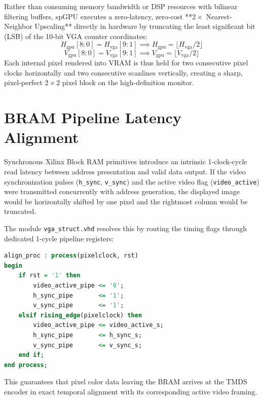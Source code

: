 Rather than consuming memory bandwidth or DSP resources with bilinear filtering buffers, spGPU executes a zero-latency, zero-cost **$2\times$ Nearest-Neighbor Upscaling** directly in hardware by truncating the least significant bit (LSB) of the 10-bit VGA counter coordinates:
\begin{equation}
H_{\text{gpu}}[8:0] = H_{\text{vga}}[9:1] \implies H_{\text{gpu}} = \lfloor H_{\text{vga}} / 2 \rfloor
\end{equation}
\begin{equation}
V_{\text{gpu}}[8:0] = V_{\text{vga}}[9:1] \implies V_{\text{gpu}} = \lfloor V_{\text{vga}} / 2 \rfloor
\end{equation}
Each internal pixel rendered into VRAM is thus held for two consecutive pixel clocks horizontally and two consecutive scanlines vertically, creating a sharp, pixel-perfect $2 \times 2$ pixel block on the high-definition monitor.

\section{BRAM Pipeline Latency Alignment}
Synchronous Xilinx Block RAM primitives introduce an intrinsic 1-clock-cycle read latency between address presentation and valid data output. If the video synchronization pulses (\texttt{h\_sync}, \texttt{v\_sync}) and the active video flag (\texttt{video\_active}) were transmitted concurrently with address generation, the displayed image would be horizontally shifted by one pixel and the rightmost column would be truncated.

The module \texttt{vga\_struct.vhd} resolves this by routing the timing flags through dedicated 1-cycle pipeline registers:
\begin{lstlisting}[language=VHDL, caption={Pipeline Latency Alignment in \texttt{vga\_struct.vhd}.}, label={lst:vga_pipeline}]
align_proc : process(pixelclock, rst)
begin
    if rst = '1' then
        video_active_pipe <= '0';
        h_sync_pipe       <= '1';
        v_sync_pipe       <= '1';
    elsif rising_edge(pixelclock) then
        video_active_pipe <= video_active_s;
        h_sync_pipe       <= h_sync_s;
        v_sync_pipe       <= v_sync_s;
    end if;
end process;
\end{lstlisting}
This guarantees that pixel color data leaving the BRAM arrives at the TMDS encoder in exact temporal alignment with its corresponding active video framing.

